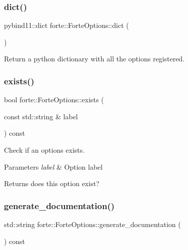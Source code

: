 \subsubsection{\texorpdfstring{dict()}{dict()}}
{\footnotesize\ttfamily pybind11\+::dict forte\+::\+Forte\+Options\+::dict (\begin{DoxyParamCaption}{ }\end{DoxyParamCaption})}



Return a python dictionary with all the options registered. 

\mbox{\label{classforte_1_1_forte_options_ab29512318f351d9ae5a1fb386aaa829f}} 
\subsubsection{\texorpdfstring{exists()}{exists()}}
{\footnotesize\ttfamily bool forte\+::\+Forte\+Options\+::exists (\begin{DoxyParamCaption}\item[{const std\+::string \&}]{label }\end{DoxyParamCaption}) const}



Check if an options exists. 


\begin{DoxyParams}{Parameters}
{\em label} & Option label \\
\hline
\end{DoxyParams}
\begin{DoxyReturn}{Returns}
does this option exist? 
\end{DoxyReturn}
\mbox{\label{classforte_1_1_forte_options_a05b9f51a5169801e089c1cfed97d0f64}} 
\subsubsection{\texorpdfstring{generate\+\_\+documentation()}{generate\_documentation()}}
{\footnotesize\ttfamily std\+::string forte\+::\+Forte\+Options\+::generate\+\_\+documentation (\begin{DoxyParamCaption}{ }\end{DoxyParamCaption}) const}



